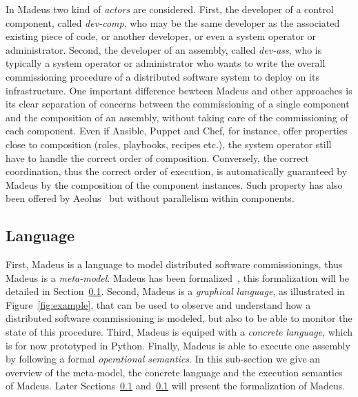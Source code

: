 In Madeus two kind of \emph{actors} are considered. First, the
developer of a control component, called \emph{dev-comp}, who may be
the same developer as the associated existing piece of code, or
another developer, or even a system operator or administrator. Second,
the developer of an assembly, called \emph{dev-ass}, who is typically
 a system operator or administrator
who wants to write the overall commissioning procedure of a
distributed software system to deploy on its infrastructure. One
important difference bewteen Madeus and other approaches is its clear
separation of concerns between the commissioning of a single component
and the composition of an assembly, without taking care of the
commissioning of each component. Even if Ansible, Puppet and Chef, for
instance, offer properties close to composition (\eg roles, playbooks,
recipes etc.), the system operator still have to handle the correct
order of composition. Conversely, the correct coordination, thus the
correct order of execution, is automatically guaranteed by Madeus by
the composition of the component instances. Such property has also
been offered by Aeolus~\cite{} but without parallelism within
components.

\subsection{Language}


First, Madeus is a language to model distributed software
commissionings, thus Madeus is a \emph{meta-model}. Madeus has been
formalized~\cite{}, this formalization will be detailed in
Section~\ref{}. Second, Madeus is a \emph{graphical language}, as
illustrated in Figure~\ref{fig:example}, that can be used to observe
and understand how a distributed software commissioning is modeled,
but also to be able to monitor the state of this procedure. Third,
Madeus is equiped with a \emph{concrete language}, which is for now
prototyped in Python. Finally, Madeus is able to execute one assembly
by following a formal \emph{operational semantics}. In this
sub-section we give an overview of the meta-model, the concrete
language and the execution semantics of Madeus. Later Sections~\ref{}
and~\ref{} will present the formalization of Madeus.



